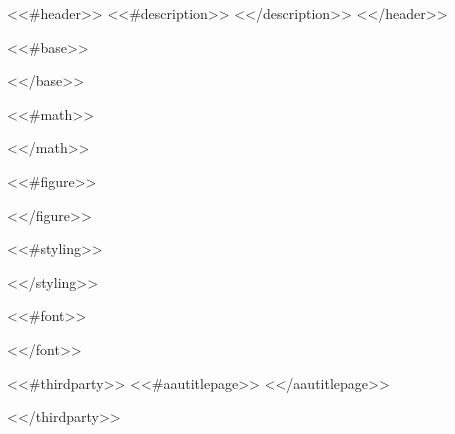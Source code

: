 <<#header>>
<<#description>>
<</description>>
<</header>>


<<#base>>
\usepackage[T1]{fontenc}           %
\usepackage[utf8]{inputenc}        %
\usepackage{babel}                 %
\usepackage[square]{natbib}        %
\usepackage{hyperref}              %
\usepackage{xpatch}                %
<</base>>

<<#math>>
\usepackage{mathtools}             %
\usepackage{amssymb}               %
\usepackage{amsthm}                %
\usepackage{bbm}                   %
\usepackage{bm}                    %
<</math>>

<<#figure>>
\usepackage[dvipsnames]{xcolor}    %
\usepackage{graphicx}              %
\usepackage{booktabs}              %
\usepackage{caption}               %
\usepackage{subcaption}            %
\usepackage{tikz}                  %
\usepackage[chapter]{algorithm}    %
\usepackage[noend]{algpseudocode}  %
\usepackage{listings}              %
<</figure>>

<<#styling>>
\usepackage{microtype}             %
\usepackage{emptypage}             %
\usepackage{fancyhdr}              %
\usepackage{titlesec}              %
\usepackage[margin=3cm]{geometry}  %
\usepackage[toc,page]{appendix}    %
\usepackage[some]{background}      %
<</styling>>

<<#font>>
\usepackage{fourier}               %
\usepackage{DejaVuSansMono}        %
<</font>>

<<#thirdparty>>
<<#aautitlepage>>
<</aautitlepage>>
\usepackage{incl/pre/ext/aautitlepage}
<</thirdparty>>
